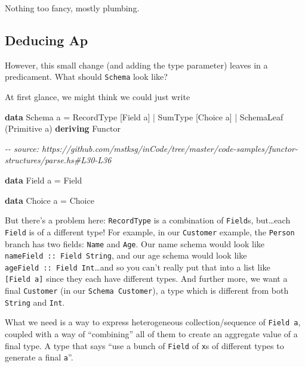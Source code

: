 \documentclass[]{article}
\newenvironment{Shaded}{}{}
\newcommand{\CommentTok}[1]{\textcolor[rgb]{0.38,0.63,0.69}{\textit{#1}}}
\newcommand{\DataTypeTok}[1]{\textcolor[rgb]{0.56,0.13,0.00}{#1}}
\newcommand{\KeywordTok}[1]{\textcolor[rgb]{0.00,0.44,0.13}{\textbf{#1}}}
\newcommand{\NormalTok}[1]{#1}
\newcommand{\OperatorTok}[1]{\textcolor[rgb]{0.40,0.40,0.40}{#1}}
\newcommand{\OtherTok}[1]{\textcolor[rgb]{0.00,0.44,0.13}{#1}}
\begin{document}
Nothing too fancy, mostly plumbing.

\hypertarget{deducing-ap}{%
\subsection{Deducing Ap}\label{deducing-ap}}

However, this small change (and adding the type parameter) leaves in a
predicament. What should \texttt{Schema} look like?

At first glance, we might think we could just write

\begin{Shaded}
\begin{Highlighting}[]
\KeywordTok{data} \DataTypeTok{Schema}\NormalTok{ a }\OtherTok{=}
      \DataTypeTok{RecordType}\NormalTok{  [}\DataTypeTok{Field}\NormalTok{ a]}
    \OperatorTok{|} \DataTypeTok{SumType}\NormalTok{     [}\DataTypeTok{Choice}\NormalTok{ a]}
    \OperatorTok{|} \DataTypeTok{SchemaLeaf}\NormalTok{  (}\DataTypeTok{Primitive}\NormalTok{ a)}
  \KeywordTok{deriving} \DataTypeTok{Functor}

\CommentTok{{-}{-} source: https://github.com/mstksg/inCode/tree/master/code{-}samples/functor{-}structures/parse.hs\#L30{-}L36}

\KeywordTok{data} \DataTypeTok{Field}\NormalTok{ a }\OtherTok{=} \DataTypeTok{Field}

\KeywordTok{data} \DataTypeTok{Choice}\NormalTok{ a }\OtherTok{=} \DataTypeTok{Choice}
\end{Highlighting}
\end{Shaded}

But there's a problem here: \texttt{RecordType} is a combination of
\texttt{Field}s, but\ldots each \texttt{Field} is of a different type! For
example, in our \texttt{Customer} example, the \texttt{Person} branch has two
fields: \texttt{Name} and \texttt{Age}. Our name schema would look like
\texttt{nameField\ ::\ Field\ String}, and our age schema would look like
\texttt{ageField\ ::\ Field\ Int}\ldots and so you can't really put that into a
list like \texttt{{[}Field\ a{]}} since they each have different types. And
further more, we want a final \texttt{Customer} (in our
\texttt{Schema\ Customer}), a type which is different from both \texttt{String}
and \texttt{Int}.

What we need is a way to express heterogeneous collection/sequence of
\texttt{Field\ a}, coupled with a way of ``combining'' all of them to create an
aggregate value of a final type. A type that says ``use a bunch of
\texttt{Field} of \texttt{x}s of different types to generate a final
\texttt{a}''.
\end{document}
